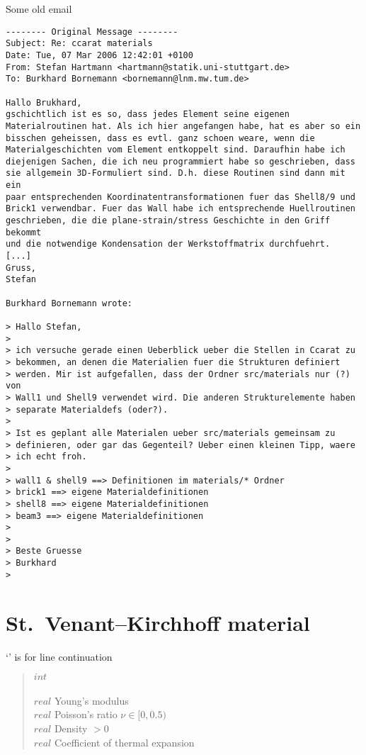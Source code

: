 Some old email
\begin{verbatim}
-------- Original Message --------
Subject: Re: ccarat materials
Date: Tue, 07 Mar 2006 12:42:01 +0100
From: Stefan Hartmann <hartmann@statik.uni-stuttgart.de>
To: Burkhard Bornemann <bornemann@lnm.mw.tum.de>

Hallo Brukhard,
gschichtlich ist es so, dass jedes Element seine eigenen 
Materialroutinen hat. Als ich hier angefangen habe, hat es aber so ein 
bisschen geheissen, dass es evtl. ganz schoen weare, wenn die 
Materialgeschichten vom Element entkoppelt sind. Daraufhin habe ich 
diejenigen Sachen, die ich neu programmiert habe so geschrieben, dass 
sie allgemein 3D-Formuliert sind. D.h. diese Routinen sind dann mit ein 
paar entsprechenden Koordinatentransformationen fuer das Shell8/9 und 
Brick1 verwendbar. Fuer das Wall habe ich entsprechende Huellroutinen 
geschrieben, die die plane-strain/stress Geschichte in den Griff bekommt 
und die notwendige Kondensation der Werkstoffmatrix durchfuehrt.
[...]
Gruss,
Stefan

Burkhard Bornemann wrote:

> Hallo Stefan,
>
> ich versuche gerade einen Ueberblick ueber die Stellen in Ccarat zu 
> bekommen, an denen die Materialien fuer die Strukturen definiert 
> werden. Mir ist aufgefallen, dass der Ordner src/materials nur (?) von 
> Wall1 und Shell9 verwendet wird. Die anderen Strukturelemente haben 
> separate Materialdefs (oder?).
>
> Ist es geplant alle Materialen ueber src/materials gemeinsam zu 
> definieren, oder gar das Gegenteil? Ueber einen kleinen Tipp, waere 
> ich echt froh.
>
> wall1 & shell9 ==> Definitionen im materials/* Ordner
> brick1 ==> eigene Materialdefinitionen
> shell8 ==> eigene Materialdefinitionen
> beam3 ==> eigene Materialdefinitionen
>
>
> Beste Gruesse
> Burkhard
>
\end{verbatim}

\section{St.~Venant--Kirchhoff material}
  `\cnl' is for line continuation
\begin{quote}
 $int$ \cnl\\
 \cnl\\
 $real$ \cnl \chs  Young's modulus\\
 $real$ \cnl \chs  Poisson's ratio $\nu\in[0,0.5)$\\
 $real$ \cnl \chs Density $>0$\\
 $real$ \chs Coefficient of thermal expansion
\end{quote}